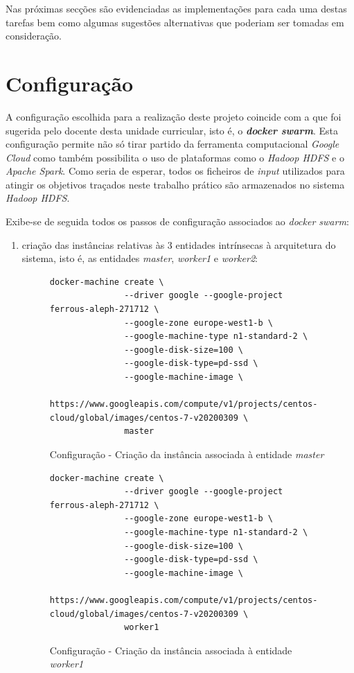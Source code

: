 \documentclass[a4paper]{report}
\begin{document}
{    Nas próximas secções são evidenciadas as implementações para cada uma destas tarefas bem como algumas sugestões alternativas que poderiam ser tomadas em consideração.

    \section{Configuração} \label{sec:Configuration}
        A configuração escolhida para a realização deste projeto coincide com a que foi sugerida pelo docente desta unidade curricular, isto é, o \textbf{\textit{docker swarm}}.
        Esta configuração permite não só tirar partido da ferramenta computacional \textit{Google Cloud} como também possibilita o uso de plataformas como o \textit{Hadoop HDFS} e o \textit{Apache Spark}.
        Como seria de esperar, todos os ficheiros de \textit{input} utilizados para atingir os objetivos traçados neste trabalho prático são armazenados no sistema \textit{Hadoop HDFS}.
        
        Exibe-se de seguida todos os passos de configuração associados ao \textit{docker swarm}:
        \begin{enumerate}[label=\textbf{\arabic*.}]
            \item criação das instâncias relativas às 3 entidades intrínsecas à arquitetura do sistema, isto é, as entidades \textsl{master}, \textsl{worker1} e \textsl{worker2}:
            \begin{figure}[H]
                \centering
                \begin{verbatim}
docker-machine create \
               --driver google --google-project ferrous-aleph-271712 \
               --google-zone europe-west1-b \
               --google-machine-type n1-standard-2 \
               --google-disk-size=100 \
               --google-disk-type=pd-ssd \
               --google-machine-image \
       https://www.googleapis.com/compute/v1/projects/centos-cloud/global/images/centos-7-v20200309 \
               master
                \end{verbatim}
                \caption{Configuração - Criação da instância associada à entidade \textsl{master}}
                \label{fig:1}
            \end{figure}
            
            \begin{figure}[H]
                \centering
                \begin{verbatim}
docker-machine create \
               --driver google --google-project ferrous-aleph-271712 \
               --google-zone europe-west1-b \
               --google-machine-type n1-standard-2 \
               --google-disk-size=100 \
               --google-disk-type=pd-ssd \
               --google-machine-image \
       https://www.googleapis.com/compute/v1/projects/centos-cloud/global/images/centos-7-v20200309 \
               worker1
                \end{verbatim}
                \caption{Configuração - Criação da instância associada à entidade \textsl{worker1}}
                \label{fig:2}
            \end{figure}


\end{enumerate}}
\end{document}
